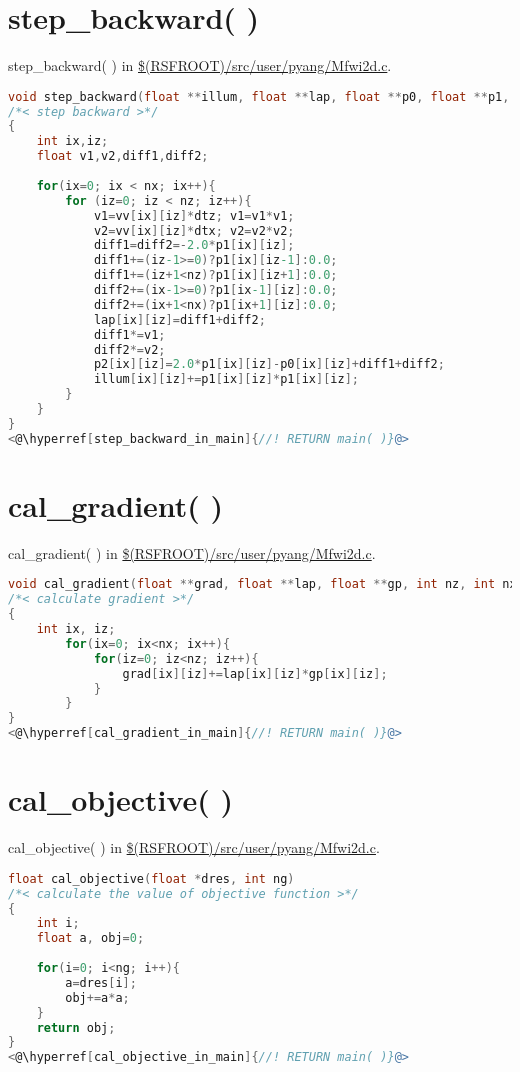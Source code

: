\documentclass[a4paper,11pt]{article}
\theoremstyle{mytheor}
\begin{document}
\section*{step\_backward( )}
step\_backward( ) in \url{$(RSFROOT)/src/user/pyang/Mfwi2d.c}.
\begin{lstlisting}[label={step_backward},language=C,tabsize=4,caption=step\_backward( )]
void step_backward(float **illum, float **lap, float **p0, float **p1, float **p2, float **vv, float dtz, float dtx, int nz, int nx)
/*< step backward >*/
{
	int ix,iz;
	float v1,v2,diff1,diff2;    
	
	for(ix=0; ix < nx; ix++){
		for (iz=0; iz < nz; iz++){
			v1=vv[ix][iz]*dtz; v1=v1*v1;
			v2=vv[ix][iz]*dtx; v2=v2*v2;
			diff1=diff2=-2.0*p1[ix][iz];
			diff1+=(iz-1>=0)?p1[ix][iz-1]:0.0;
			diff1+=(iz+1<nz)?p1[ix][iz+1]:0.0;
			diff2+=(ix-1>=0)?p1[ix-1][iz]:0.0;
			diff2+=(ix+1<nx)?p1[ix+1][iz]:0.0;
			lap[ix][iz]=diff1+diff2;
			diff1*=v1;
			diff2*=v2;
			p2[ix][iz]=2.0*p1[ix][iz]-p0[ix][iz]+diff1+diff2;
			illum[ix][iz]+=p1[ix][iz]*p1[ix][iz];
		}
	}
}
<@\hyperref[step_backward_in_main]{//! RETURN main( )}@>
\end{lstlisting}

\section*{cal\_gradient( )}
cal\_gradient( ) in \url{$(RSFROOT)/src/user/pyang/Mfwi2d.c}.
\begin{lstlisting}[label={cal_gradient},language=C,tabsize=4,caption=cal\_gradient( )]
void cal_gradient(float **grad, float **lap, float **gp, int nz, int nx)
/*< calculate gradient >*/
{
	int ix, iz;
		for(ix=0; ix<nx; ix++){
			for(iz=0; iz<nz; iz++){
				grad[ix][iz]+=lap[ix][iz]*gp[ix][iz];
			}
		}
}
<@\hyperref[cal_gradient_in_main]{//! RETURN main( )}@>
\end{lstlisting}

\section*{cal\_objective( )}
cal\_objective( ) in \url{$(RSFROOT)/src/user/pyang/Mfwi2d.c}.
\begin{lstlisting}[label={cal_objective},language=C,tabsize=4,caption=cal\_objective( )]
float cal_objective(float *dres, int ng)
/*< calculate the value of objective function >*/
{
	int i;
	float a, obj=0;
	
	for(i=0; i<ng; i++){
		a=dres[i];
		obj+=a*a;
	}
	return obj;
}
<@\hyperref[cal_objective_in_main]{//! RETURN main( )}@>
\end{lstlisting}
\end{document}
